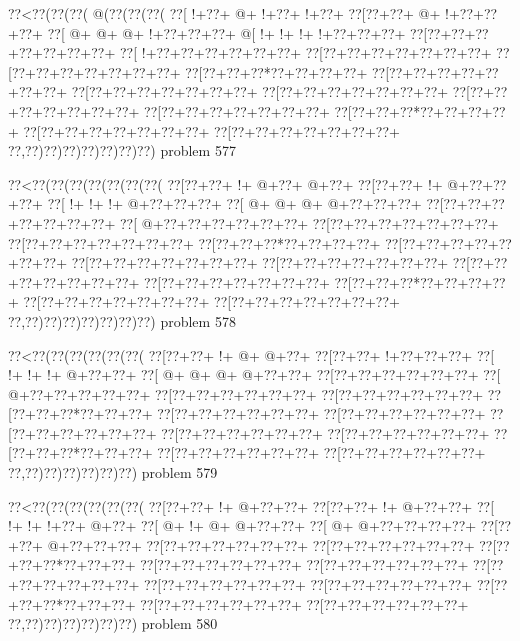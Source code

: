 \vbox{\vbox{\goo
\0??<\0??(\0??(\0??(\- @(\0??(\0??(\0??(
\0??[\- !+\0??+\- @+\- !+\0??+\- !+\0??+
\0??[\0??+\0??+\- @+\- !+\0??+\0??+\0??+
\0??[\- @+\- @+\- @+\- !+\0??+\0??+\0??+
\- @[\- !+\- !+\- !+\- !+\0??+\0??+\0??+
\0??[\0??+\0??+\0??+\0??+\0??+\0??+\0??+
\0??[\- !+\0??+\0??+\0??+\0??+\0??+\0??+
\0??[\0??+\0??+\0??+\0??+\0??+\0??+\0??+
\0??[\0??+\0??+\0??+\0??+\0??+\0??+\0??+
\0??[\0??+\0??+\0??*\0??+\0??+\0??+\0??+
\0??[\0??+\0??+\0??+\0??+\0??+\0??+\0??+
\0??[\0??+\0??+\0??+\0??+\0??+\0??+\0??+
\0??[\0??+\0??+\0??+\0??+\0??+\0??+\0??+
\0??[\0??+\0??+\0??+\0??+\0??+\0??+\0??+
\0??[\0??+\0??+\0??+\0??+\0??+\0??+\0??+
\0??[\0??+\0??+\0??*\0??+\0??+\0??+\0??+
\0??[\0??+\0??+\0??+\0??+\0??+\0??+\0??+
\0??[\0??+\0??+\0??+\0??+\0??+\0??+\0??+
\0??,\0??)\0??)\0??)\0??)\0??)\0??)\0??)
}
\hfil problem 577\hfil\break
}

\vbox{\vbox{\goo
\0??<\0??(\0??(\0??(\0??(\0??(\0??(\0??(
\0??[\0??+\0??+\- !+\- @+\0??+\- @+\0??+
\0??[\0??+\0??+\- !+\- @+\0??+\0??+\0??+
\0??[\- !+\- !+\- !+\- @+\0??+\0??+\0??+
\0??[\- @+\- @+\- @+\- @+\0??+\0??+\0??+
\0??[\0??+\0??+\0??+\0??+\0??+\0??+\0??+
\0??[\- @+\0??+\0??+\0??+\0??+\0??+\0??+
\0??[\0??+\0??+\0??+\0??+\0??+\0??+\0??+
\0??[\0??+\0??+\0??+\0??+\0??+\0??+\0??+
\0??[\0??+\0??+\0??*\0??+\0??+\0??+\0??+
\0??[\0??+\0??+\0??+\0??+\0??+\0??+\0??+
\0??[\0??+\0??+\0??+\0??+\0??+\0??+\0??+
\0??[\0??+\0??+\0??+\0??+\0??+\0??+\0??+
\0??[\0??+\0??+\0??+\0??+\0??+\0??+\0??+
\0??[\0??+\0??+\0??+\0??+\0??+\0??+\0??+
\0??[\0??+\0??+\0??*\0??+\0??+\0??+\0??+
\0??[\0??+\0??+\0??+\0??+\0??+\0??+\0??+
\0??[\0??+\0??+\0??+\0??+\0??+\0??+\0??+
\0??,\0??)\0??)\0??)\0??)\0??)\0??)\0??)
}
\hfil problem 578\hfil\break
}

\vbox{\vbox{\goo
\0??<\0??(\0??(\0??(\0??(\0??(\0??(
\0??[\0??+\0??+\- !+\- @+\- @+\0??+
\0??[\0??+\0??+\- !+\0??+\0??+\0??+
\0??[\- !+\- !+\- !+\- @+\0??+\0??+
\0??[\- @+\- @+\- @+\- @+\0??+\0??+
\0??[\0??+\0??+\0??+\0??+\0??+\0??+
\0??[\- @+\0??+\0??+\0??+\0??+\0??+
\0??[\0??+\0??+\0??+\0??+\0??+\0??+
\0??[\0??+\0??+\0??+\0??+\0??+\0??+
\0??[\0??+\0??+\0??*\0??+\0??+\0??+
\0??[\0??+\0??+\0??+\0??+\0??+\0??+
\0??[\0??+\0??+\0??+\0??+\0??+\0??+
\0??[\0??+\0??+\0??+\0??+\0??+\0??+
\0??[\0??+\0??+\0??+\0??+\0??+\0??+
\0??[\0??+\0??+\0??+\0??+\0??+\0??+
\0??[\0??+\0??+\0??*\0??+\0??+\0??+
\0??[\0??+\0??+\0??+\0??+\0??+\0??+
\0??[\0??+\0??+\0??+\0??+\0??+\0??+
\0??,\0??)\0??)\0??)\0??)\0??)\0??)
}
\hfil problem 579\hfil\break
}

\vbox{\vbox{\goo
\0??<\0??(\0??(\0??(\0??(\0??(\0??(
\0??[\0??+\0??+\- !+\- @+\0??+\0??+
\0??[\0??+\0??+\- !+\- @+\0??+\0??+
\0??[\- !+\- !+\- !+\0??+\- @+\0??+
\0??[\- @+\- !+\- @+\- @+\0??+\0??+
\0??[\- @+\- @+\0??+\0??+\0??+\0??+
\0??[\0??+\0??+\- @+\0??+\0??+\0??+
\0??[\0??+\0??+\0??+\0??+\0??+\0??+
\0??[\0??+\0??+\0??+\0??+\0??+\0??+
\0??[\0??+\0??+\0??*\0??+\0??+\0??+
\0??[\0??+\0??+\0??+\0??+\0??+\0??+
\0??[\0??+\0??+\0??+\0??+\0??+\0??+
\0??[\0??+\0??+\0??+\0??+\0??+\0??+
\0??[\0??+\0??+\0??+\0??+\0??+\0??+
\0??[\0??+\0??+\0??+\0??+\0??+\0??+
\0??[\0??+\0??+\0??*\0??+\0??+\0??+
\0??[\0??+\0??+\0??+\0??+\0??+\0??+
\0??[\0??+\0??+\0??+\0??+\0??+\0??+
\0??,\0??)\0??)\0??)\0??)\0??)\0??)
}
\hfil problem 580\hfil\break
}

